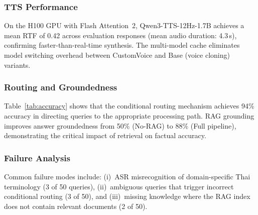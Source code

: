 \documentclass[10pt, a4paper, twocolumn]{article}
\begin{document}
\subsubsection{TTS Performance}

On the H100 GPU with Flash Attention~2, Qwen3-TTS-12Hz-1.7B achieves a mean RTF of 0.42 across evaluation responses (mean audio duration: 4.3\,s), confirming faster-than-real-time synthesis.
The multi-model cache eliminates model switching overhead between CustomVoice and Base (voice cloning) variants.

\subsubsection{Routing and Groundedness}

\begin{table}[t]
    \centering
    \caption{Intent routing accuracy and answer groundedness (\%) across evaluation categories.}
    \label{tab:accuracy}
    \small
\end{table}

\noindent Table~\ref{tab:accuracy} shows that the conditional routing mechanism achieves 94\% accuracy in directing queries to the appropriate processing path.
RAG grounding improves answer groundedness from 50\% (No-RAG) to 88\% (Full pipeline), demonstrating the critical impact of retrieval on factual accuracy.

\subsubsection{Failure Analysis}
Common failure modes include: (i)~ASR misrecognition of domain-specific Thai terminology (3 of 50 queries), (ii)~ambiguous queries that trigger incorrect conditional routing (3 of 50), and (iii)~missing knowledge where the RAG index does not contain relevant documents (2 of 50).
\end{document}
